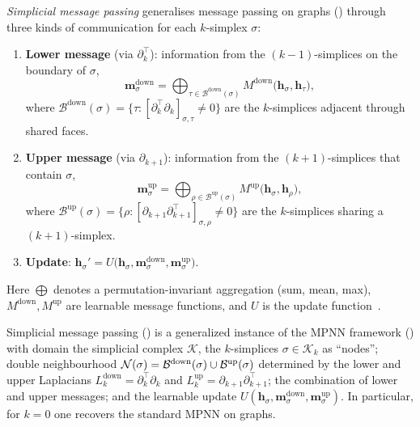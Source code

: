 \begin{definition}
\label{def:priors:simplicial-mp}
\emph{Simplicial message passing} generalises message passing on graphs
() through three kinds of communication for each
$k$-simplex $\sigma$:
\begin{enumerate}
\item \textbf{Lower message} (via $\partial_k^{\!\top}$): information from the
$(k{-}1)$-simplices on the boundary of $\sigma$,
\[
  \mathbf{m}_\sigma^{\mathrm{down}}
    = \bigoplus_{\tau \in \mathcal{B}^{\mathrm{down}}(\sigma)}
      M^{\mathrm{down}}\bigl(\mathbf{h}_\sigma, \mathbf{h}_\tau\bigr),
\]
where $\mathcal{B}^{\mathrm{down}}(\sigma) =
\{\tau : [\partial_k^{\!\top} \partial_k]_{\sigma,\tau} \neq 0\}$ are the
$k$-simplices adjacent through shared faces.
\item \textbf{Upper message} (via $\partial_{k+1}$): information from the
$(k{+}1)$-simplices that contain $\sigma$,
\[
  \mathbf{m}_\sigma^{\mathrm{up}}
    = \bigoplus_{\rho \in \mathcal{B}^{\mathrm{up}}(\sigma)}
      M^{\mathrm{up}}\bigl(\mathbf{h}_\sigma, \mathbf{h}_\rho\bigr),
\]
where $\mathcal{B}^{\mathrm{up}}(\sigma) =
\{\rho : [\partial_{k+1} \partial_{k+1}^{\!\top}]_{\sigma,\rho} \neq 0\}$ are the
$k$-simplices sharing a $(k{+}1)$-simplex.
\item \textbf{Update}:
$\mathbf{h}_\sigma' = U\bigl(\mathbf{h}_\sigma,
\mathbf{m}_\sigma^{\mathrm{down}}, \mathbf{m}_\sigma^{\mathrm{up}}\bigr)$.
\end{enumerate}
Here $\bigoplus$ denotes a permutation-invariant aggregation (sum, mean, max),
$M^{\mathrm{down}}, M^{\mathrm{up}}$ are learnable message functions, and $U$ is
the update function~\citep{bodnar2021weisfeiler}.
\end{definition}

\begin{proposition}
\label{prop:priors:tdl-mpnn}
Simplicial message passing () is a generalized
instance of the MPNN framework () with domain the
simplicial complex $\mathcal{K}$, the $k$-simplices $\sigma \in \mathcal{K}_k$ as
``nodes''; double neighbourhood
$\mathcal{N}(\sigma) = \mathcal{B}^{\mathrm{down}}(\sigma) \cup
\mathcal{B}^{\mathrm{up}}(\sigma)$ determined by the lower and upper Laplacians
$L_k^{\mathrm{down}} = \partial_k^{\!\top} \partial_k$ and
$L_k^{\mathrm{up}} = \partial_{k+1} \partial_{k+1}^{\!\top}$; the combination of
lower and upper messages; and the learnable update
$U(\mathbf{h}_\sigma, \mathbf{m}_\sigma^{\mathrm{down}},
\mathbf{m}_\sigma^{\mathrm{up}})$. In particular, for $k = 0$ one recovers the
standard MPNN on graphs.
\end{proposition}


